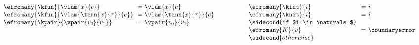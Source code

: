 \begin{TwoColumn}

  \multicolsbreak

\end{TwoColumn}

\begin{flushleft}
  \\[-2.7ex]{
  $\begin{array}{l@{\hspace{4.4em}}l}
    \begin{array}{l@{~~}c@{~}l}
      \efromany{\kfun}{\vlam{x}{e}} & = & \vlam{x}{e}
      \\
      \efromany{\kfun}{\vlam{\tann{x}{\tau}}{e}} & = & \vlam{\tann{x}{\tau}}{e}
      \\
      \efromany{\kpair}{\vpair{v_0}{v_1}} & = & \vpair{v_0}{v_1}
      \\
      \\
    \end{array}
  &
    \begin{array}{l@{~~}c@{~}l}
      \\
      \efromany{\kint}{i} & = & i
      \\
      \efromany{\knat}{i} & = & i
      \\ \sidecond{if $i \in \naturals$}
      \\
      \efromany{K}{v} & = & \boundaryerror
      \\ \sidecond{otherwise}
    \end{array}
  \end{array}$
}
\end{flushleft}
